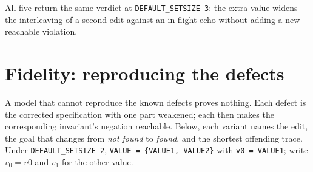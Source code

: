 \documentclass[a4paper,10pt,fleqn]{article}
\begin{document}
All five return the same verdict at \texttt{DEFAULT\_SETSIZE 3}: the extra value
widens the interleaving of a second edit against an in-flight echo without
adding a new reachable violation.

\section{Fidelity: reproducing the defects}
\label{sec:fidelity}

A model that cannot reproduce the known defects proves nothing.  Each defect is
the corrected specification with one part weakened; each then makes the
corresponding invariant's negation reachable.  Below, each variant names the
edit, the goal that changes from \emph{not found} to \emph{found}, and the
shortest offending trace.  Under \texttt{DEFAULT\_SETSIZE 2},
\texttt{VALUE = \{VALUE1, VALUE2\}} with \texttt{v0 = VALUE1}; write $v_0 = v0$
and $v_1$ for the other value.
\end{document}
